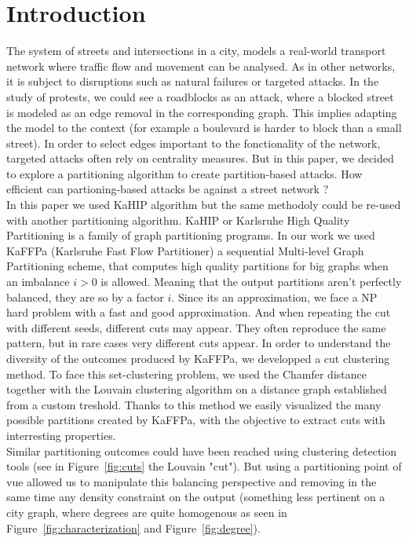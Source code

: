\section{Introduction}
\label{sec:introduction}
The system of streets and intersections in a city, models a real-world transport network where traffic flow and movement can be analysed. As in other networks, it is subject to disruptions such as natural failures or targeted attacks. In the study of protests, we could see a roadblocks as an attack, where a blocked street is modeled as an edge removal in the corresponding graph. This implies adapting the model to the context (for example a boulevard is harder to block than a small street). In order to select edges important to the fonctionality of the network, targeted attacks often rely on centrality measures. But in this paper, we decided to explore a partitioning algorithm to create partition-based attacks. How efficient can partioning-based attacks be against a street network ?\\
In this paper we used KaHIP algorithm but the same methodoly could be re-used with another partitioning algorithm. KaHIP or Karlsruhe High Quality Partitioning \cite{sanders2012think} is a family of graph partitioning programs. In our work we used KaFFPa (Karlsruhe Fast Flow Partitioner) a sequential Multi-level Graph Partitioning scheme, that computes high quality partitions for big graphs when an imbalance $i > 0$ is allowed. Meaning that the output partitions aren't perfectly balanced, they are so by a factor $i$. Since its an approximation, we face a NP hard problem with a fast and good approximation. And when repeating the cut with different seeds, different cuts may appear. They often reproduce the same pattern, but in rare cases very different cuts appear. In order to understand the diversity of the outcomes produced by KaFFPa, we developped a cut clustering method. To face this set-clustering problem, we used the Chamfer distance together with the Louvain clustering algorithm on a distance graph established from a custom treshold. Thanks to this method we easily visualized the many possible partitions created by KaFFPa, with the objective to extract cuts with interresting properties.\\
Similar partitioning outcomes could have been reached using clustering detection tools (see in Figure~\ref{fig:cuts} the Louvain "cut"). But using a partitioning point of vue allowed us to manipulate this balancing perspective and removing in the same time any density constraint on the output (something less pertinent on a city graph, where degrees are quite homogenous as seen in Figure~\ref{fig:characterization} and Figure~\ref{fig:degree}).\\
